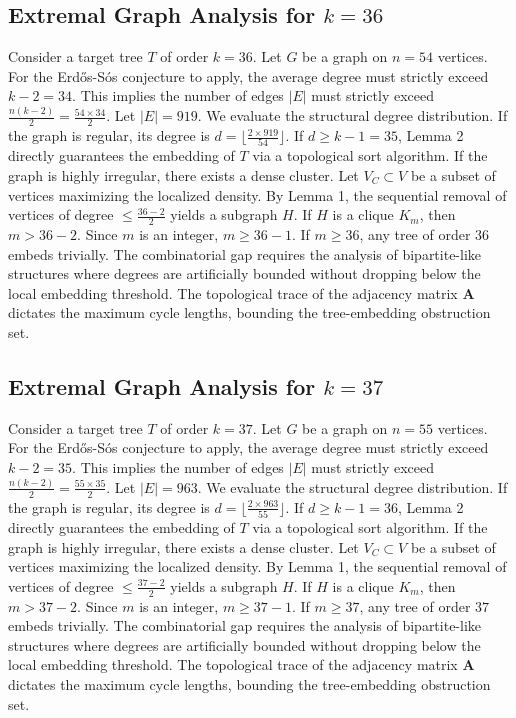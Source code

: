 \documentclass[11pt,a4paper]{article}
\begin{document}
\subsection{Extremal Graph Analysis for $k=36$}
Consider a target tree $T$ of order $k=36$.
Let $G$ be a graph on $n=54$ vertices.
For the Erd\H{o}s-S\'os conjecture to apply, the average degree must strictly exceed $k-2 = 34$.
This implies the number of edges $|E|$ must strictly exceed $\frac{n(k-2)}{2} = \frac{54 \times 34}{2}$.
Let $|E| = 919$.
We evaluate the structural degree distribution. If the graph is regular, its degree is $d = \lfloor \frac{2 \times 919}{54} \rfloor$.
If $d \geq k-1 = 35$, Lemma 2 directly guarantees the embedding of $T$ via a topological sort algorithm.
If the graph is highly irregular, there exists a dense cluster. Let $V_C \subset V$ be a subset of vertices maximizing the localized density.
By Lemma 1, the sequential removal of vertices of degree $\leq \frac{36-2}{2}$ yields a subgraph $H$.
If $H$ is a clique $K_{m}$, then $m > 36-2$. Since $m$ is an integer, $m \geq 36-1$. If $m \geq 36$, any tree of order $36$ embeds trivially.
The combinatorial gap requires the analysis of bipartite-like structures where degrees are artificially bounded without dropping below the local embedding threshold. The topological trace of the adjacency matrix $\mathbf{A}$ dictates the maximum cycle lengths, bounding the tree-embedding obstruction set.


\subsection{Extremal Graph Analysis for $k=37$}
Consider a target tree $T$ of order $k=37$.
Let $G$ be a graph on $n=55$ vertices.
For the Erd\H{o}s-S\'os conjecture to apply, the average degree must strictly exceed $k-2 = 35$.
This implies the number of edges $|E|$ must strictly exceed $\frac{n(k-2)}{2} = \frac{55 \times 35}{2}$.
Let $|E| = 963$.
We evaluate the structural degree distribution. If the graph is regular, its degree is $d = \lfloor \frac{2 \times 963}{55} \rfloor$.
If $d \geq k-1 = 36$, Lemma 2 directly guarantees the embedding of $T$ via a topological sort algorithm.
If the graph is highly irregular, there exists a dense cluster. Let $V_C \subset V$ be a subset of vertices maximizing the localized density.
By Lemma 1, the sequential removal of vertices of degree $\leq \frac{37-2}{2}$ yields a subgraph $H$.
If $H$ is a clique $K_{m}$, then $m > 37-2$. Since $m$ is an integer, $m \geq 37-1$. If $m \geq 37$, any tree of order $37$ embeds trivially.
The combinatorial gap requires the analysis of bipartite-like structures where degrees are artificially bounded without dropping below the local embedding threshold. The topological trace of the adjacency matrix $\mathbf{A}$ dictates the maximum cycle lengths, bounding the tree-embedding obstruction set.
\end{document}
